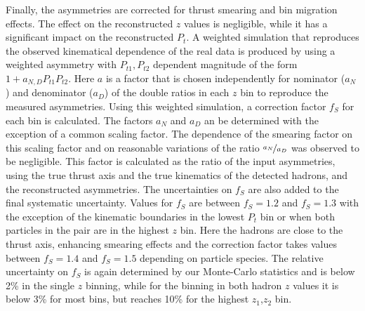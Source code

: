 \documentclass[aps,prX,preprint,groupedaddress,linenumbers]{revtex4-1}
\begin{document}
Finally, the  asymmetries are corrected for thrust smearing and bin migration effects. The effect on the reconstructed $z$ values is negligible, while it has a significant impact on the reconstructed $P_t$. A weighted simulation that reproduces the observed kinematical dependence of the real data is produced by using a weighted asymmetry with $P_ {t1},P_{t2}$ dependent magnitude of the form $1+a_{N,D}P_{t1}P_{t2}$. Here $a$ is a factor that is chosen independently for nominator ($a_N$) and denominator ($a_D$) of the double ratios in each $z$ bin to reproduce the measured asymmetries. Using this weighted simulation, a correction factor $f_S$ for each bin is calculated. The factors $a_N$ and $a_D$ an be determined with the exception of a common scaling factor. The dependence of the smearing factor on this scaling factor and on reasonable variations of the ratio $\nicefrac{a_N}{a_D}$ was observed to be negligible. 
This factor is calculated as the ratio of the input asymmetries, using the true thrust axis and the true kinematics of the detected hadrons, and the reconstructed asymmetries. The uncertainties on $f_S$ are also added to the final systematic uncertainty. Values for $f_S$ are between $f_S=1.2$ and $f_S=1.3$ with the exception of the kinematic boundaries in the lowest $P_t$ bin or when both particles in the pair are in the highest $z$ bin. Here the hadrons are close to the thrust axis, enhancing smearing effects and the correction factor takes values between $f_S=1.4$ and $f_S=1.5$ depending on particle species. The relative uncertainty on $f_S$ is again determined by our Monte-Carlo statistics and is below 2\% in the single $z$ binning, while for the binning in both hadron $z$ values it is below 3\% for most bins, but reaches 10\% for the highest $z_1$,$z_2$ bin. 

\end{document}
